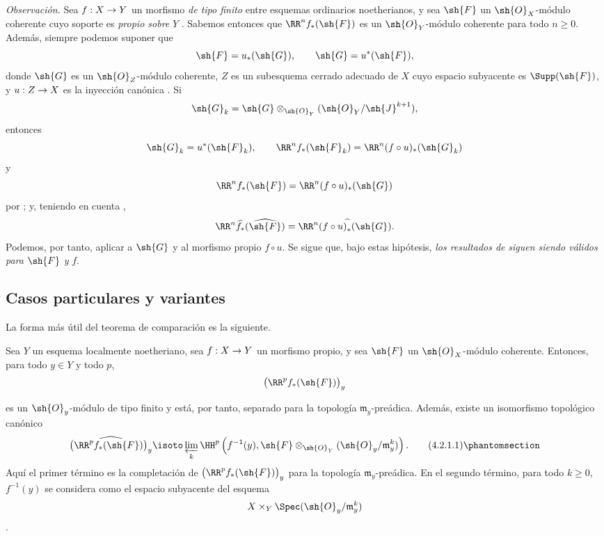 \documentclass[oneside]{amsart}
\makeatletter
\renewcommand{\geq}{\geqslant}
\newcommand{\ega@arrow}[2]{\mathchoice{#1}{#2}{#2}{#2}}
\renewcommand{\to}{\ega@arrow{\longrightarrow}{\rightarrow}}
\newcommand{\oldpage}[2][]{{\marginnote{\normalfont\textbf{#1}~|~#2}}\ignorespaces}
\let\EGAOriginalLabel\label
\renewcommand{\label}[1]{\phantomsection\EGAOriginalLabel{#1}}
\makeatother
\begin{document}
\begin{env}[4.1.10]
\label{III.4.1.10}
\emph{Observación.}
Sea $f:X\to Y$ un morfismo \emph{de tipo finito} entre esquemas ordinarios
noetherianos, y sea $\sh{F}$ un $\sh{O}_X$-módulo coherente cuyo
soporte es \emph{propio sobre} $Y$ .
Sabemos entonces  que $\RR^n f_*(\sh{F})$ es un
$\sh{O}_Y$-módulo coherente para todo $n\geq0$.
Además, siempre podemos suponer que
\[
  \sh{F}=u_*(\sh{G}),
  \qquad
  \sh{G}=u^*(\sh{F}),
\]
donde $\sh{G}$ es un $\sh{O}_Z$-módulo coherente, $Z$ es un
subesquema cerrado adecuado de $X$ cuyo espacio subyacente es
$\Supp(\sh{F})$, y $u:Z\to X$ es la inyección canónica
.
Si
\[
  \sh{G}_k
  =
  \sh{G}\otimes_{\sh{O}_Y}
  (\sh{O}_Y/\sh{J}^{k+1}),
\]
entonces
\[
  \sh{G}_k=u^*(\sh{F}_k),
  \qquad
  \RR^n f_*(\sh{F}_k)
  =
  \RR^n(f\circ u)_*(\sh{G}_k)
\]
y
\[
  \RR^n f_*(\sh{F})
  =
  \RR^n(f\circ u)_*(\sh{G})
\]
por ; y, teniendo en cuenta ,
\[
  \RR^n\widehat{f}_*(\widehat{\sh{F}})
  =
  \RR^n(f\circ u)^{\widehat{\,}}_*(\sh{G}).
\]
Podemos, por tanto, aplicar  a $\sh{G}$ y al morfismo
propio $f\circ u$.
Se sigue que, bajo estas hipótesis, \emph{los resultados de}
 \emph{siguen siendo válidos para} $\sh{F}$ \emph{y} $f$.
\end{env}


\subsection{Casos particulares y variantes}
\label{subsection:III.4.2}

La forma más útil del teorema de comparación  es la
siguiente.

\begin{proposition}[4.2.1]
\label{III.4.2.1}
Sea $Y$ un esquema localmente noetheriano, sea $f:X\to Y$ un
morfismo propio, y sea $\sh{F}$ un $\sh{O}_X$-módulo coherente.
Entonces, para todo $y\in Y$ y todo $p$,
\[
  \bigl(\RR^p f_*(\sh{F})\bigr)_y
\]

\oldpage[III]{130}

es un $\sh{O}_y$-módulo de tipo finito y está, por tanto, separado
para la topología $\mathfrak{m}_y$-preádica.
Además, existe un isomorfismo topológico canónico
\[
  \widehat{\bigl(\RR^p f_*(\sh{F})\bigr)_y}
  \isoto
  \varprojlim_k
  \HH^p\left(
    f^{-1}(y),
    \sh{F}\otimes_{\sh{O}_Y}
    (\sh{O}_y/\mathfrak{m}_y^k)
  \right).
  \tag{4.2.1.1}
  \label{III.4.2.1.1}
\]
Aquí el primer término es la completación de
$\bigl(\RR^p f_*(\sh{F})\bigr)_y$ para la topología
$\mathfrak{m}_y$-preádica.
En el segundo término, para todo $k\geq0$, $f^{-1}(y)$ se considera
como el espacio subyacente del esquema
\[
  X\times_Y\Spec(\sh{O}_y/\mathfrak{m}_y^k)
\]
.
\end{proposition}
\end{document}
